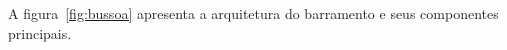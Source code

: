 A figura~\ref{fig:bussoa} apresenta a arquitetura do barramento \openbus{} e seus componentes principais.

